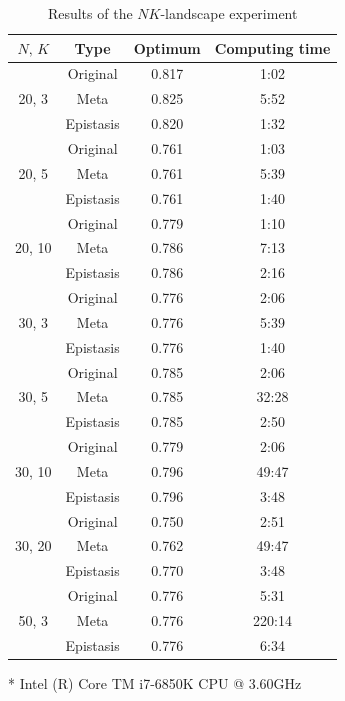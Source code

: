 \begin{table}[ht!]
	\centering
	\begin{threeparttable}
		\caption{Results of the $ NK $-landscape experiment} \label{tab:result_nk}
\begin{tabular}{cccc}
	\toprule
	$ N,\, K$ & Type & Optimum & Computing time\tnote{*} \\
	\midrule
	\multirow{3}{*}{20, 3}	& Original		& 0.817 & 1:02 \\
							& Meta			& 0.825 & 5:52 \\
							& Epistasis		& 0.820 & 1:32 \\
	\midrule
	\multirow{3}{*}{20, 5}	& Original		& 0.761 & 1:03 \\
							& Meta			& 0.761 & 5:39 \\
							& Epistasis		& 0.761 & 1:40 \\
	\midrule
	\multirow{3}{*}{20, 10}	& Original		& 0.779 & 1:10 \\
							& Meta			& 0.786 & 7:13 \\
							& Epistasis		& 0.786 & 2:16 \\
	\midrule
	\multirow{3}{*}{30, 3}	& Original		& 0.776 & 2:06 \\
							& Meta			& 0.776 & 5:39 \\
							& Epistasis		& 0.776 & 1:40 \\
	\midrule
	\multirow{3}{*}{30, 5}	& Original		& 0.785 & 2:06 \\
							& Meta			& 0.785 & 32:28 \\
							& Epistasis		& 0.785 & 2:50 \\
	\midrule
	\multirow{3}{*}{30, 10}	& Original		& 0.779 & 2:06 \\
							& Meta			& 0.796 & 49:47 \\
							& Epistasis		& 0.796 & 3:48 \\
	\midrule
	\multirow{3}{*}{30, 20}	& Original		& 0.750 & 2:51 \\
							& Meta			& 0.762 & 49:47 \\
							& Epistasis		& 0.770 & 3:48 \\
	\midrule
	\multirow{3}{*}{50, 3}	& Original		& 0.776 & 5:31 \\
							& Meta			& 0.776 & 220:14 \\
							& Epistasis		& 0.776 & 6:34 \\
	\bottomrule
\end{tabular}
\begin{tablenotes}
	\footnotesize
	\item[*] Intel (R) Core TM i7-6850K CPU @ 3.60GHz
\end{tablenotes}
	\end{threeparttable}
\end{table}


